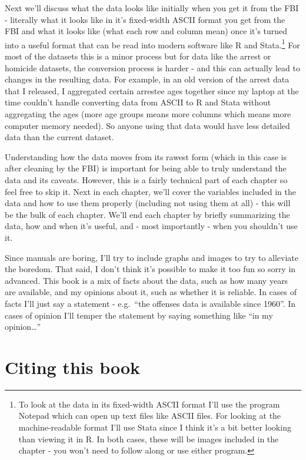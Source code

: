 \documentclass[
  12pt,
  openany]{book}
\begin{document}
Next we'll discuss what the data looks like initially when you get it from the FBI - literally what it looks like in it's fixed-width ASCII format you get from the FBI and what it looks like (what each row and column mean) once it's turned into a useful format that can be read into modern software like R and Stata.\footnote{To look at the data in its fixed-width ASCII format I'll use the program Notepad which can open up text files like ASCII files. For looking at the machine-readable format I'll use Stata since I think it's a bit better looking than viewing it in R. In both cases, these will be images included in the chapter - you won't need to follow along or use either program.} For most of the datasets this is a minor process but for data like the arrest or homicide datasets, the conversion process is harder - and this can actually lead to changes in the resulting data. For example, in an old version of the arrest data that I released, I aggregated certain arrestee ages together since my laptop at the time couldn't handle converting data from ASCII to R and Stata without aggregating the ages (more age groups means more columns which means more computer memory needed). So anyone using that data would have less detailed data than the current dataset.

Understanding how the data moves from its rawest form (which in this case is after cleaning by the FBI) is important for being able to truly understand the data and its caveats. However, this is a fairly technical part of each chapter so feel free to skip it. Next in each chapter, we'll cover the variables included in the data and how to use them properly (including not using them at all) - this will be the bulk of each chapter. We'll end each chapter by briefly summarizing the data, how and when it's useful, and - most importantly - when you shouldn't use it.

Since manuals are boring, I'll try to include graphs and images to try to alleviate the boredom. That said, I don't think it's possible to make it too fun so sorry in advanced. This book is a mix of facts about the data, such as how many years are available, and my opinions about it, such as whether it is reliable. In cases of facts I'll just say a statement - e.g.~``the offenses data is available since 1960''. In cases of opinion I'll temper the statement by saying something like ``in my opinion\ldots{}''

\hypertarget{citing-this-book}{%
\section*{Citing this book}\label{citing-this-book}}
\end{document}
